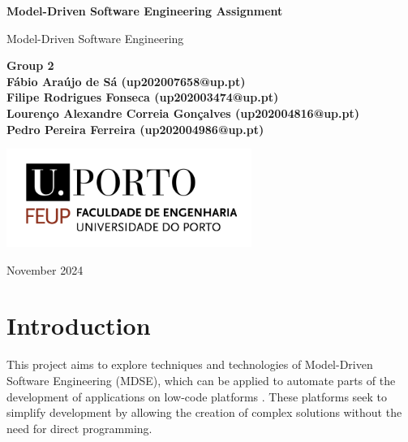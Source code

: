 \documentclass[10pt]{article}
\begin{document}
\begin{titlepage}
   \begin{center}
       \vspace*{1cm}
       {\fontsize{17}{16}\selectfont\textbf{Model-Driven Software Engineering Assignment}}

       \vspace{0.5cm}
        Model-Driven Software Engineering
            
       \vspace{1.5cm}

       \textbf{Group 2}\\
       \textbf{Fábio Araújo de Sá (up202007658@up.pt)}\\
       \textbf{Filipe Rodrigues Fonseca (up202003474@up.pt)}\\
       \textbf{Lourenço Alexandre Correia Gonçalves (up202004816@up.pt)}\\
       \textbf{Pedro Pereira Ferreira (up202004986@up.pt)}\\
       \vfill
            
       \includegraphics[width=0.6\textwidth]{imgs/FEUP.png}
        
       \vspace{2cm}
            
       November 2024
            
   \end{center}
\end{titlepage}

\tableofcontents
\clearpage

\section{Introduction}

This project aims to explore techniques and technologies of Model-Driven Software Engineering (MDSE), which can be applied to automate parts of the development of applications on low-code platforms \cite{brambilla2017mdse}. These platforms seek to simplify development by allowing the creation of complex solutions without the need for direct programming.
\end{document}
